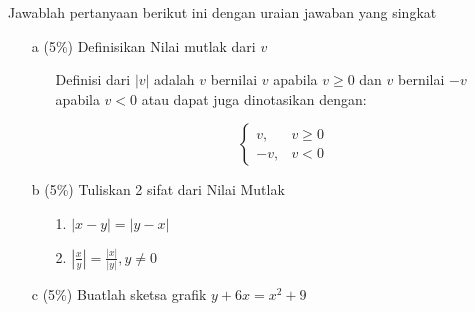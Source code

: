 \documentclass[12pt, a4paper]{article}
\begin{document}
    Jawablah pertanyaan berikut ini dengan uraian jawaban yang singkat
    \begin{enumerate}
        \item[a] (5\%) Definisikan Nilai mutlak dari $v$
        \item[] \begin{enumerate}
            \item[] Definisi dari $|v|$ adalah $v$ bernilai $v$ apabila $v \geq 0$ dan $v$ bernilai $-v$ apabila $v < 0$ atau dapat juga dinotasikan dengan:
            
            \[\left\{ \begin{array}{rcl}v,& v\geq 0 \\ -v,& v < 0\end{array}\right.\]

        \end{enumerate}
        \vspace{1cm}
        \item[b] (5\%) Tuliskan 2 sifat dari Nilai Mutlak
        \item[] \begin{enumerate}
            \item[1.] $|x-y| = |y-x|$ 
            \item[2.] $|\frac{x}{y}| = \frac{|x|}{|y|}, y \neq 0$ 
        \end{enumerate}
        \vspace{1cm}
        \item[c] (5\%) Buatlah sketsa grafik $y + 6x = x^2 + 9$

\end{enumerate}
\end{document}

